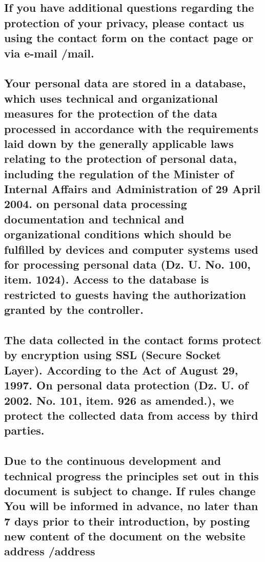 \subsection{If you have additional questions regarding the protection of your privacy, please contact us using the contact form on the contact page or via e-mail /mail.}

\subsection{Your personal data are stored in a database, which uses technical and organizational measures for the protection of the data processed in accordance with the requirements laid down by the generally applicable laws relating to the protection of personal data, including the regulation of the Minister of Internal Affairs and Administration of 29 April 2004. on personal data processing documentation and technical and organizational conditions which should be fulfilled by devices and computer systems used for processing personal data (Dz. U. No. 100, item. 1024). Access to the database is restricted to guests having the authorization granted by the controller.}

\subsection{The data collected in the contact forms protect by encryption using SSL (Secure Socket Layer). According to the Act of August 29, 1997. On personal data protection (Dz. U. of 2002. No. 101, item. 926 as amended.), we protect the collected data from access by third parties.}

\subsection{Due to the continuous development and technical progress the principles set out in this document is subject to change. If rules change You will be informed in advance, no later than 7 days prior to their introduction, by posting new content of the document on the website address /address} 

 
